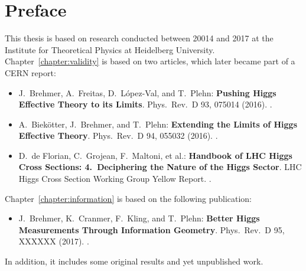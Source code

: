 
\chapter*{Preface}
\label{chapter:preface}

This thesis is based on research conducted between 20014 and 2017 at
the Institute for Theoretical Physics at Heidelberg
University. Chapter~\ref{chapter:validity} is based on two articles,
which later became part of a CERN report:
%
\begin{itemize}
  \item[\cite{Brehmer:2015rna}] J.~Brehmer, A.~Freitas, D.~L\'opez-Val, and T.~Plehn:\newline
	\textbf{Pushing Higgs Effective Theory to its Limits}.\newline
	Phys.~Rev.~D 93, 075014 (2016). .
  \item[\cite{Biekotter:2016ecg}] A.~Biek\"otter, J.~Brehmer, and T.~Plehn:\newline
	\textbf{Extending the Limits of Higgs Effective Theory}.\newline
	Phys.~Rev.~D 94, 055032 (2016). . 
  \item[\cite{deFlorian:2016spz}] D.~de Florian, C.~Grojean, F.~Maltoni, et al.:\newline
        \textbf{Handbook of LHC Higgs Cross Sections: 4.~Deciphering the Nature of the Higgs Sector}.\newline
        LHC Higgs Cross Section Working Group Yellow Report. .
\end{itemize}
%
Chapter~\ref{chapter:information} is based on the following publication:
%
\begin{itemize}
  \item[\cite{Brehmer:2016nyr}] J.~Brehmer, K.~Cranmer, F.~Kling, and T.~Plehn:\newline
	\textbf{Better Higgs Measurements Through Information Geometry}.\newline
       Phys.~Rev.~D 95, XXXXXX (2017). .
\end{itemize}
%
In addition, it includes some original results and yet unpublished
work.

